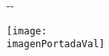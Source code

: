 {  %
  \newlength{\margenPortada}
  \setlength{\margenPortada}{2.54cm}

  \setlength{\cambioIzquierdo}{\cambioIzquierdo - \margenPortada}
  \setlength{\cambioDerecho}{\cambioDerecho - \margenPortada}



  \thispagestyle{empty}

  \begin{cambiamargen}{-\cambioIzquierdo}{-\cambioDerecho}


      \newlength{\evensidemarginOriginal}
      \setlength{\evensidemarginOriginal}{\evensidemargin}

      \newlength{\oddsidemarginOriginal}
      \setlength{\oddsidemarginOriginal}{\oddsidemargin}

      \setlength{\evensidemargin}{0cm}
      \setlength{\oddsidemargin}{0cm}

      \vfill

      \begin{large}
        \begin{center}
          
          \textbf{\institucionVal}%
        \end{center}
      \end{large}

      \vfill

      \begin{center}
        \vfill
        \texttt{[image: \\imagenPortadaVal]}\\[5mm]
        
      \end{center}

      \begin{Huge}
        \begin{center}
          {\textbf{\tipoDocumentoVal}}
        \end{center}
      \end{Huge}


\end{cambiamargen}}

